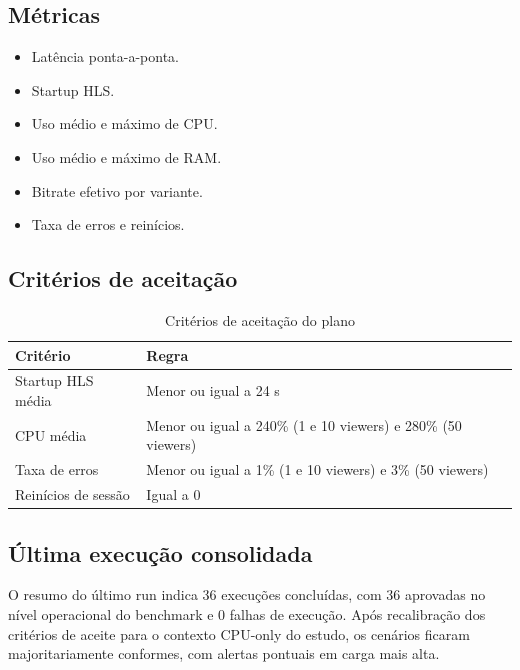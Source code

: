 \subsection{Métricas}

\begin{itemize}[leftmargin=1.2cm]
  \item Latência ponta-a-ponta.
  \item Startup HLS.
  \item Uso médio e máximo de CPU.
  \item Uso médio e máximo de RAM.
  \item Bitrate efetivo por variante.
  \item Taxa de erros e reinícios.
\end{itemize}

\subsection{Critérios de aceitação}

\begin{table}[H]
\centering
\caption{Critérios de aceitação do plano}
\begin{tabularx}{\textwidth}{@{}lX@{}}
\toprule
\textbf{Critério} & \textbf{Regra} \\
\midrule
Startup HLS média & Menor ou igual a 24 s \\
CPU média & Menor ou igual a 240\% (1 e 10 viewers) e 280\% (50 viewers) \\
Taxa de erros & Menor ou igual a 1\% (1 e 10 viewers) e 3\% (50 viewers) \\
Reinícios de sessão & Igual a 0 \\
\bottomrule
\end{tabularx}
\end{table}

\subsection{Última execução consolidada}

O resumo do último run indica 36 execuções concluídas, com 36 aprovadas no nível operacional do benchmark e 0 falhas de execução. Após recalibração dos critérios de aceite para o contexto CPU-only do estudo, os cenários ficaram majoritariamente conformes, com alertas pontuais em carga mais alta.

